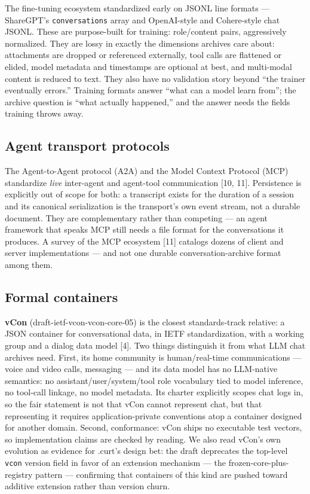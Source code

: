 \documentclass[11pt]{article}
\begin{document}
The fine-tuning ecosystem standardized early on JSONL line formats --- ShareGPT's \texttt{conversations} array and OpenAI-style and Cohere-style chat JSONL. These are purpose-built for training: role/content pairs, aggressively normalized. They are lossy in exactly the dimensions archives care about: attachments are dropped or referenced externally, tool calls are flattened or elided, model metadata and timestamps are optional at best, and multi-modal content is reduced to text. They also have no validation story beyond ``the trainer eventually errors.'' Training formats answer ``what can a model learn from''; the archive question is ``what actually happened,'' and the answer needs the fields training throws away.

\subsection{Agent transport protocols}

The Agent-to-Agent protocol (A2A) and the Model Context Protocol (MCP) standardize \emph{live} inter-agent and agent-tool communication [10, 11]. Persistence is explicitly out of scope for both: a transcript exists for the duration of a session and its canonical serialization is the transport's own event stream, not a durable document. They are complementary rather than competing --- an agent framework that speaks MCP still needs a file format for the conversations it produces. A survey of the MCP ecosystem [11] catalogs dozens of client and server implementations --- and not one durable conversation-archive format among them.

\subsection{Formal containers}

\textbf{vCon} (draft-ietf-vcon-vcon-core-05) is the closest standards-track relative: a JSON container for conversational data, in IETF standardization, with a working group and a dialog data model [4]. Two things distinguish it from what LLM chat archives need. First, its home community is human/real-time communications --- voice and video calls, messaging --- and its data model has no LLM-native semantics: no assistant/user/system/tool role vocabulary tied to model inference, no tool-call linkage, no model metadata. Its charter explicitly scopes chat logs in, so the fair statement is not that vCon cannot represent chat, but that representing it requires application-private conventions atop a container designed for another domain. Second, conformance: vCon ships no executable test vectors, so implementation claims are checked by reading. We also read vCon's own evolution as evidence for .curt's design bet: the draft deprecates the top-level \texttt{vcon} version field in favor of an extension mechanism --- the frozen-core-plus-registry pattern --- confirming that containers of this kind are pushed toward additive extension rather than version churn.
\end{document}
